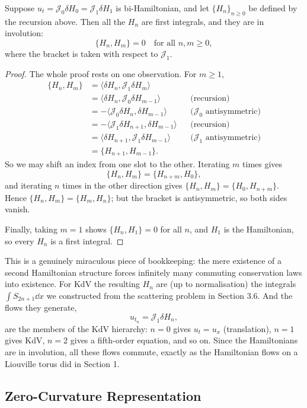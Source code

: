 \documentclass[a4paper]{scrartcl}
\newcommand{\ip}[2]{\langle #1, #2 \rangle}
\begin{document}
\begin{theorem}[Magri]
	Suppose $u_t = \mathcal J_0\delta H_0 = \mathcal J_1\delta H_1$ is bi-Hamiltonian, and let $\{H_n\}_{n\ge0}$ be defined by the recursion above. Then all the $H_n$ are first integrals, and they are in involution:
	$$
	\{H_n, H_m\} = 0\quad\text{for all }n,m\ge0,
	$$
	where the bracket is taken with respect to $\mathcal J_1$.
\end{theorem}
\begin{proof}
	The whole proof rests on one observation. For $m\ge1$,
	\begin{align*}
		\{H_n, H_m\} &= \ip{\delta H_n}{\mathcal J_1\delta H_m}\\
		&= \ip{\delta H_n}{\mathcal J_0\delta H_{m-1}} && \text{(recursion)}\\
		&= -\ip{\mathcal J_0\delta H_n}{\delta H_{m-1}} && \text{($\mathcal J_0$ antisymmetric)}\\
		&= -\ip{\mathcal J_1\delta H_{n+1}}{\delta H_{m-1}} && \text{(recursion)}\\
		&= \ip{\delta H_{n+1}}{\mathcal J_1\delta H_{m-1}} && \text{($\mathcal J_1$ antisymmetric)}\\
		&= \{H_{n+1}, H_{m-1}\}.
	\end{align*}
	So we may shift an index from one slot to the other. Iterating $m$ times gives
	$$
	\{H_n, H_m\} = \{H_{n+m}, H_0\},
	$$
	and iterating $n$ times in the other direction gives $\{H_n,H_m\} = \{H_0, H_{n+m}\}$. Hence $\{H_n, H_m\} = \{H_m, H_n\}$; but the bracket is antisymmetric, so both sides vanish.

	Finally, taking $m = 1$ shows $\{H_n, H_1\} = 0$ for all $n$, and $H_1$ is the Hamiltonian, so every $H_n$ is a first integral.
\end{proof}

This is a genuinely miraculous piece of bookkeeping: the mere existence of a second Hamiltonian structure forces infinitely many commuting conservation laws into existence. For KdV the resulting $H_n$ are (up to normalisation) the integrals $\int S_{2n+1}\dd x$ we constructed from the scattering problem in Section 3.6. And the flows they generate,
$$
u_{t_n} = \mathcal J_1\delta H_n,
$$
are the members of the KdV hierarchy: $n=0$ gives $u_t = u_x$ (translation), $n=1$ gives KdV, $n=2$ gives a fifth-order equation, and so on. Since the Hamiltonians are in involution, all these flows commute, exactly as the Hamiltonian flows on a Liouville torus did in Section 1.

\subsection{Zero-Curvature Representation}
\end{document}
